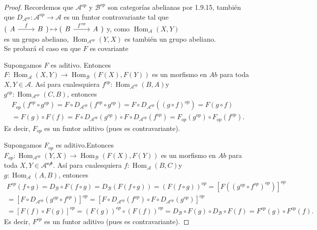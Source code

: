 \documentclass{article}
\begin{document}
\begin{enumerate}[label=\textbf{Ej \arabic*.}]
\begin{proof} Recordemos que $\mathscr{A}^{op}$ y $\mathscr{B}^{op}$ son categorías abelianas por 1.9.15, también que
 $D_{\mathscr{A}^{op}}:\mathscr{A}^{op}\longrightarrow \mathscr{A}$ es un funtor contravariante tal que 
$(\begin{tikzcd} A\arrow{r}{f}&B\end{tikzcd})\mapsto(\begin{tikzcd} B\arrow{r}{f^{op}}&A\end{tikzcd})$ y, como $\operatorname{Hom}_\mathscr{A}
(X,Y)$ \\es un grupo abeliano, $\displaystyle\operatorname{Hom}_{\mathscr{A}^{op}}(Y,X)$ es también un grupo abeliano.\\

Se probará el caso en que $F$ es covariante

 Supongamos $F$ es aditivo. Entonces \\$F:\operatorname{Hom}_\mathscr{A}(X,Y)\longrightarrow
\operatorname{Hom}_\mathscr{B}(F(X),F(Y))$ es un morfismo en $Ab$ para toda $X,Y\in \mathscr{A}$. Así para cualesquiera
 $f^{op}:\operatorname{Hom}_{\mathscr{A}^{op}}(B,A)$\quad y\\
$g^{op}:\operatorname{Hom}_{\mathscr{A}^{op}}(C,B)$, entonces
\begin{gather*}
F_{op}(f^{op}\circ g^{op})=F\circ D_{\mathscr{A}^{op}}(f^{op}\circ g^{op})=F\circ D_{\mathscr{A}^{op}}((g\circ f)^{op})=F(g\circ f)\\
=F(g)\circ F(f)=F\circ D_{\mathscr{A}^{op}}(g^{op})\circ F\circ D_{\mathscr{A}^{op}}(f^{op})=F_{op}(g^{op})\circ F_{op}(f^{op}).
\end{gather*}
Es decir,  $F_{op}$ es un funtor aditivo (pues es contravariante).

 Supongamos $F_{op}$ es aditivo.Entonces \\$F_{op}:\operatorname{Hom}_{\mathscr{A}^{op}}(Y,X)\longrightarrow
\operatorname{Hom}_\mathscr{B}(F(X),F(Y))$ es un morfismo en $Ab$ para toda $X,Y\in \mathscr{A^{op}}$. Así para cualesquiera
 $f:\operatorname{Hom}_{\mathscr{A}}(B,C)$\quad y\\
$g:\operatorname{Hom}_{\mathscr{A}}(A,B)$, entonces
\begin{gather*}
F^{op}(f\circ g)=D_{\mathscr{B}}\circ F(f\circ g)=D_{\mathscr{B}}(F(f\circ g))=(F(f\circ g))^{op}=[F((g^{op}\circ f^{op})^{op})]^{op}\\
=[F\circ D_{\mathscr{A}^{op}}(g^{op}\circ f^{op})]^{op}=[F\circ D_{\mathscr{A}^{op}}(f^{op})\circ F\circ D_{\mathscr{A}^{op}}(g^{op})]^{op}\\
=[F(f)\circ F(g)]^{op}=(F(g))^{op}\circ (F(f))^{op}=D_{\mathscr{B}}\circ F(g)\circ D_{\mathscr{B}}\circ F(f)=F^{op}(g)\circ F^{op}(f).
\end{gather*}
Es decir,  $F^{op}$ es un funtor aditivo (pues es contravariante).


\end{proof}
\end{enumerate}
\end{document}
